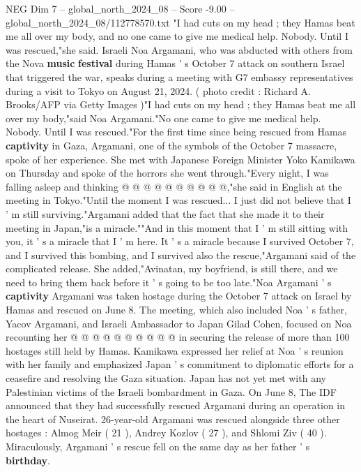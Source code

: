 \begin{textsample}{NEG Dim 7 – global\_north\_2024\_08 – Score -9.00 – global\_north\_2024\_08/112778570.txt}  \label{ex:f7_neg_083}
"I had cuts on my head ; they Hamas beat me all over my body, and no one came to give me medical help.
Nobody.
Until I was rescued,"she said.
Israeli Noa Argamani, who was abducted with others from the Nova \textbf{music} \textbf{festival} during Hamas ' s October 7 attack on southern Israel that triggered the war, speaks during a meeting with G7 embassy representatives during a visit to Tokyo on August 21, 2024. ( photo credit : Richard A.
Brooks/AFP via Getty Images )"I had cuts on my head ; they Hamas beat me all over my body,"said Noa Argamani."No one came to give me medical help.
Nobody.
Until I was rescued."For the first time since being rescued from Hamas \textbf{captivity} in Gaza, Argamani, one of the symbols of the October 7 massacre, spoke of her experience.
She met with Japanese Foreign Minister Yoko Kamikawa on Thursday and spoke of the horrors she went through."Every night, I was falling asleep and thinking @ @ @ @ @ @ @ @ @ @,"she said in English at the meeting in Tokyo."Until the moment I was rescued...
I just did not believe that I ' m still surviving."Argamani added that the fact that she made it to their meeting in Japan,"is a miracle.""And in this moment that I ' m still sitting with you, it ' s a miracle that I ' m here.
It ' s a miracle because I survived October 7, and I survived this bombing, and I survived also the rescue,"Argamani said of the complicated release.
She added,"Avinatan, my boyfriend, is still there, and we need to bring them back before it ' s going to be too late."Noa Argamani ' s \textbf{captivity} Argamani was taken hostage during the October 7 attack on Israel by Hamas and rescued on June 8.
The meeting, which also included Noa ' s father, Yacov Argamani, and Israeli Ambassador to Japan Gilad Cohen, focused on Noa recounting her @ @ @ @ @ @ @ @ @ @ in securing the release of more than 100 hostages still held by Hamas.
Kamikawa expressed her relief at Noa ' s reunion with her family and emphasized Japan ' s commitment to diplomatic efforts for a ceasefire and resolving the Gaza situation.
Japan has not yet met with any Palestinian victims of the Israeli bombardment in Gaza.
On June 8, The IDF announced that they had successfully rescued Argamani during an operation in the heart of Nuseirat. 26-year-old Argamani was rescued alongside three other hostages : Almog Meir ( 21 ), Andrey Kozlov ( 27 ), and Shlomi Ziv ( 40 ).
Miraculously, Argamani ' s rescue fell on the same day as her father ' s \textbf{birthday}.

\end{textsample}
